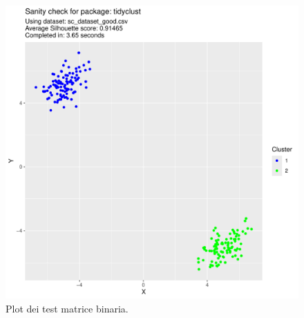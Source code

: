 \documentclass[12pt]{report}
\begin{document}
\begin{figure}[h]
\begin{boxedminipage}{0.5\textwidth}
				\end{boxedminipage}
				\begin{boxedminipage}{0.5\textwidth}
					\includegraphics[width = \textwidth, page = 3]{results/results_TIDYCLUST.pdf}
				\end{boxedminipage}
				\begin{boxedminipage}{0.5\textwidth}
				\end{boxedminipage}
				\caption{Plot dei test matrice binaria.}
				\label{fig:bm}
			\end{figure}
\end{document}
